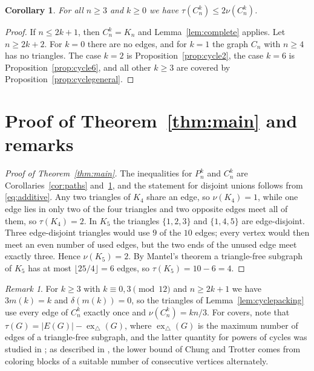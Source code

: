 \documentclass{amsart}
\newtheorem{corollary}[theorem]{Corollary}
\theoremstyle{definition}
\theoremstyle{remark}
\newtheorem{remark}[theorem]{Remark}
\numberwithin{equation}{section}
\numberwithin{table}{section}
\begin{document}
\begin{corollary}\label{cor:cycles}
For all $n\ge3$ and $k\ge0$ we have $\tau(C_n^k)\le2\nu(C_n^k)$.
\end{corollary}

\begin{proof}
If $n\le2k+1$, then $C_n^k=K_n$ and Lemma~\ref{lem:complete} applies. Let $n\ge2k+2$. For $k=0$ there are no edges, and for $k=1$ the graph $C_n$ with $n\ge4$ has no triangles. The case $k=2$ is Proposition~\ref{prop:cycle2}, the case $k=6$ is Proposition~\ref{prop:cycle6}, and all other $k\ge3$ are covered by Proposition~\ref{prop:cyclegeneral}.
\end{proof}

\section{Proof of Theorem~\ref{thm:main} and remarks}\label{sec:proof}

\begin{proof}[Proof of Theorem~\ref{thm:main}]
The inequalities for $P_n^k$ and $C_n^k$ are Corollaries~\ref{cor:paths} and~\ref{cor:cycles}, and the statement for disjoint unions follows from \eqref{eq:additive}. Any two triangles of $K_4$ share an edge, so $\nu(K_4)=1$, while one edge lies in only two of the four triangles and two opposite edges meet all of them, so $\tau(K_4)=2$. In $K_5$ the triangles $\{1,2,3\}$ and $\{1,4,5\}$ are edge-disjoint. Three edge-disjoint triangles would use $9$ of the $10$ edges; every vertex would then meet an even number of used edges, but the two ends of the unused edge meet exactly three. Hence $\nu(K_5)=2$. By Mantel's theorem a triangle-free subgraph of $K_5$ has at most $\lfloor25/4\rfloor=6$ edges, so $\tau(K_5)=10-6=4$.
\end{proof}

\begin{remark}\label{rem:exact}
For $k\ge3$ with $k\equiv0,3\pmod{12}$ and $n\ge2k+1$ we have $3m(k)=k$ and $\delta(m(k))=0$, so the triangles of Lemma~\ref{lem:cyclepacking} use every edge of $C_n^k$ exactly once and $\nu(C_n^k)=kn/3$. For covers, note that $\tau(G)=|E(G)|-\operatorname{ex}_\triangle(G)$, where $\operatorname{ex}_\triangle(G)$ is the maximum number of edges of a triangle-free subgraph, and the latter quantity for powers of cycles was studied in \cite{ChungTrotter,BondyLocke,Locke}; as described in \cite{Locke}, the lower bound of Chung and Trotter comes from coloring blocks of a suitable number of consecutive vertices alternately.
\end{remark}
\appendix
\end{document}
